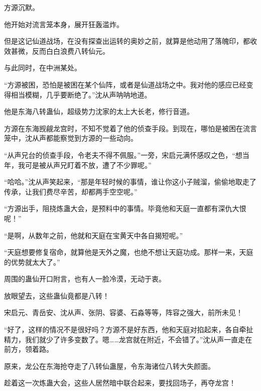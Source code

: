 \begin{this_body}
方源沉默。

他开始对流言笼本身，展开狂轰滥炸。

但是这记仙道战场，在没有探查出运转的奥妙之前，就算是他动用了落魄印，都收效甚微，反而白白浪费八转仙元。

与此同时，在中洲某处。

“方源被困，恐怕是被困在某个仙阵，或者是仙道战场之中。我对他的感应已经变得相当模糊，几乎要断绝了。”沈从声呐呐地道。

他是东海八转蛊仙，超级势力沈家的太上大长老，修行音道。

方源在东海觊觎龙宫时，不知不觉着了他的侦查手段。到现在，哪怕是被困在流言笼中，沈从声都能察觉到方源的一些动向。

“从声兄台的侦查手段，令老夫不得不佩服。”一旁，宋启元满怀感叹之色，“想当年，我可是被从声兄盯着不放，遭了不少罪呢。”

“哈哈。”沈从声笑起来，“那是年轻时候的事情，谁让你这小子贼溜，偷偷地取走了传承，让我们费尽辛苦，却都两手空空呢。”

“方源出手，阻挠炼蛊大会，是预料中的事情。毕竟他和天庭一直都有深仇大恨呢！”

“是啊，从数年之前，他就和天庭在宝黄天中各自揭短呢。”

“天庭想要修复宿命，就算他是天外之魔，也绝不想让天庭功成。那样一来，天庭的优势就太大了。”

周围的蛊仙开口附言，也有人一脸冷漠，无动于衷。

放眼望去，这些蛊仙竟都是八转！

宋启元、青岳安、沈从声、张阴、容婆、石淼等等，阵容之强大，前所未见！

“好了，这样的情况不是很好吗？方源不是好东西，他和天庭对掐起来，各自牵扯精力，我们就少了许多变数了。嗯……龙宫就在附近，不会错了。”沈从声一直走在前方，领着路。

原来，龙公在东海抢夺走了八转仙蛊屋，令东海诸位八转大失颜面。

趁着这一次炼蛊大会，这些人居然暗中联合起来，要找回场子，再夺龙宫！

\end{this_body}

